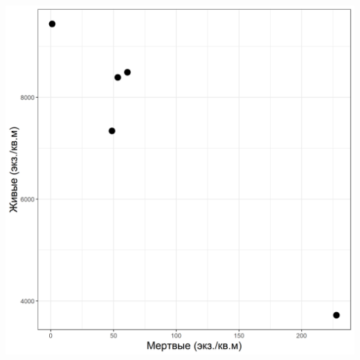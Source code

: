 \documentclass[20pt,a0,portrait]{a0poster}
\begin{document}
\begin{minipage}[t]{0.46\linewidth}
\begin{minipage}[t]{0.46\linewidth}
\begin{center}
			\includegraphics[width=0.9\linewidth]{N_dead_N_alive_hem.png}
			\label{Nalive_Ndead_hem}
		\end{center}\vspace{0.5cm}
\end{minipage}



\end{minipage}
\end{document}
